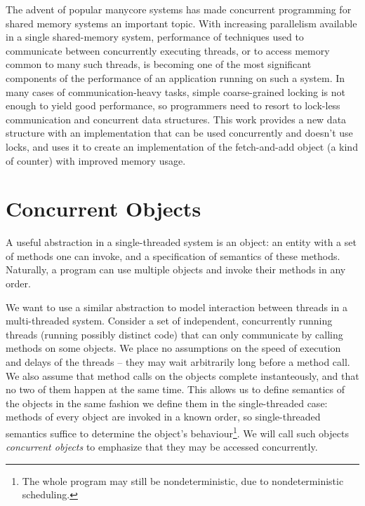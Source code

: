 \documentclass{thesis}
\begin{document}
The advent of popular manycore systems has made concurrent programming for shared memory systems an important
topic. With increasing parallelism available in a single shared-memory system, performance of techniques
used to communicate between concurrently executing threads, or to access memory common to many such threads,
is becoming one of the most significant components of the performance of an application running on such a system.
In many cases of communication-heavy tasks, simple coarse-grained locking is not enough to yield good performance,
so programmers need to resort to lock-less communication and concurrent data structures. This work provides a new
data structure with an implementation that can be used concurrently and doesn't use locks, and uses it to create
an implementation of the fetch-and-add object (a kind of counter) with improved memory usage.


\section{Concurrent Objects}
A useful abstraction in a single-threaded system is an object: an entity with a set of methods one can invoke,
and a specification of semantics of these methods. Naturally, a program can use multiple objects and invoke
their methods in any order.

We want to use a similar abstraction to model interaction between threads in a multi-threaded system.
Consider a set of independent, concurrently running threads (running possibly
distinct code) that can only communicate by calling methods on some objects. We place no assumptions on
the speed of execution and delays of the threads -- they may wait arbitrarily long before a method call.
We also assume that method calls on the objects complete instanteously, and that no two of them happen at the same time.
This allows us to define semantics of the objects in the same fashion we define them in the single-threaded case:
methods of every object are invoked in a known order, so single-threaded semantics suffice to determine the object's behaviour\footnote{The whole program may still be nondeterministic, due to nondeterministic scheduling.}.
We will call such objects \emph{concurrent objects} to emphasize that they may be accessed concurrently.

\end{document}

